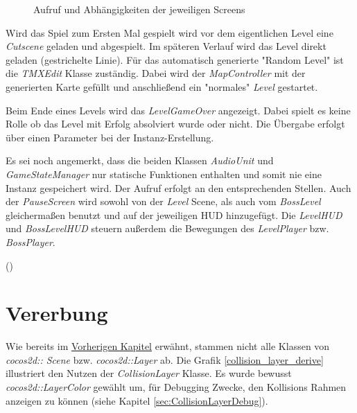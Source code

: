 \begin{figure}[h]
\scalebox{0.7}{}
\caption{Aufruf und Abhängigkeiten der jeweiligen Screens}
\label{calltree}
\end{figure}


Wird das Spiel zum Ersten Mal gespielt wird vor dem eigentlichen Level eine \textit{Cutscene} geladen und abgespielt. Im späteren Verlauf wird das Level direkt geladen (gestrichelte Linie).
Für das automatisch generierte "Random Level" ist die \textit{TMXEdit} Klasse zuständig. Dabei wird der \textit{MapController} mit der generierten Karte gefüllt und anschließend ein "normales" \textit{Level} gestartet.

Beim Ende eines Levels wird das \textit{LevelGameOver} angezeigt. Dabei spielt es keine Rolle ob das Level mit Erfolg absolviert wurde oder nicht. Die Übergabe erfolgt über einen Parameter bei der Instanz-Erstellung.

Es sei noch angemerkt, dass die beiden Klassen \textit{AudioUnit} und \textit{GameStateManager} nur statische Funktionen enthalten und somit nie eine Instanz gespeichert wird. Der Aufruf erfolgt an den entsprechenden Stellen.
Auch der \textit{PauseScreen} wird sowohl von der \textit{Level} Scene, als auch vom \textit{BossLevel} gleichermaßen benutzt und auf der jeweiligen HUD hinzugefügt. Die \textit{LevelHUD} und \textit{BossLevelHUD} steuern außerdem die Bewegungen des \textit{LevelPlayer} bzw. \textit{BossPlayer}.

()

\section{Vererbung}\label{sec:Vererbung}

Wie bereits im \href{sec:Klassenuebersicht}{Vorherigen Kapitel} erwähnt, stammen nicht alle Klassen von \textit{cocos2d:: Scene} bzw. \textit{cocos2d::Layer} ab. Die Grafik \ref{collision_layer_derive} illustriert den Nutzen der \textit{CollisionLayer} Klasse.
Es wurde bewusst \textit{cocos2d::LayerColor} gewählt um, für Debugging Zwecke, den Kollisions Rahmen anzeigen zu können (siehe Kapitel \ref{sec:CollisionLayerDebug}).

